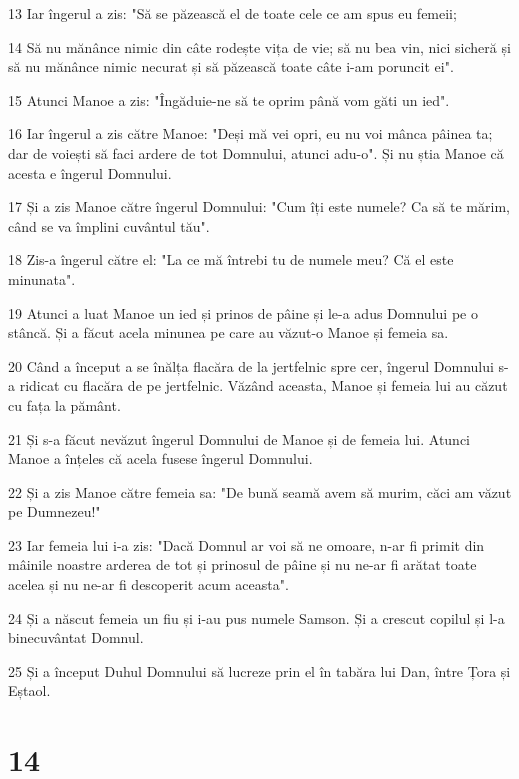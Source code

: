 \par 13 Iar îngerul a zis: "Să se păzească el de toate cele ce am spus eu femeii;
\par 14 Să nu mănânce nimic din câte rodește vița de vie; să nu bea vin, nici sicheră și să nu mănânce nimic necurat și să păzească toate câte i-am poruncit ei".
\par 15 Atunci Manoe a zis: "Îngăduie-ne să te oprim până vom găti un ied".
\par 16 Iar îngerul a zis către Manoe: "Deși mă vei opri, eu nu voi mânca pâinea ta; dar de voiești să faci ardere de tot Domnului, atunci adu-o". Și nu știa Manoe că acesta e îngerul Domnului.
\par 17 Și a zis Manoe către îngerul Domnului: "Cum îți este numele? Ca să te mărim, când se va împlini cuvântul tău".
\par 18 Zis-a îngerul către el: "La ce mă întrebi tu de numele meu? Că el este minunata".
\par 19 Atunci a luat Manoe un ied și prinos de pâine și le-a adus Domnului pe o stâncă. Și a făcut acela minunea pe care au văzut-o Manoe și femeia sa.
\par 20 Când a început a se înălța flacăra de la jertfelnic spre cer, îngerul Domnului s-a ridicat cu flacăra de pe jertfelnic. Văzând aceasta, Manoe și femeia lui au căzut cu fața la pământ.
\par 21 Și s-a făcut nevăzut îngerul Domnului de Manoe și de femeia lui. Atunci Manoe a înțeles că acela fusese îngerul Domnului.
\par 22 Și a zis Manoe către femeia sa: "De bună seamă avem să murim, căci am văzut pe Dumnezeu!"
\par 23 Iar femeia lui i-a zis: "Dacă Domnul ar voi să ne omoare, n-ar fi primit din mâinile noastre arderea de tot și prinosul de pâine și nu ne-ar fi arătat toate acelea și nu ne-ar fi descoperit acum aceasta".
\par 24 Și a născut femeia un fiu și i-au pus numele Samson. Și a crescut copilul și l-a binecuvântat Domnul.
\par 25 Și a început Duhul Domnului să lucreze prin el în tabăra lui Dan, între Țora și Eștaol.

\chapter{14}

